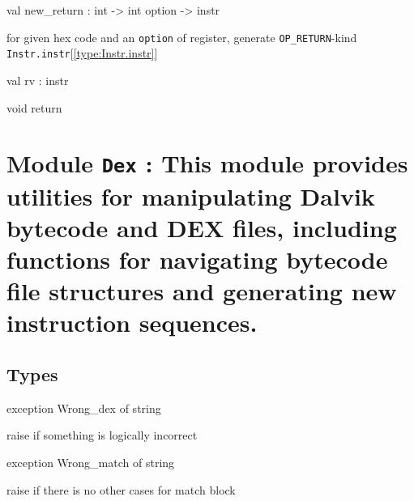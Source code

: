 \documentclass[11pt]{article}
\begin{document}
\label{val:Instr.new-underscorereturn}\begin{ocamldoccode}
val new_return : int -> int option -> instr
\end{ocamldoccode}
\begin{ocamldocdescription}
for given hex code and an {\tt{option}} of register,
 generate {\tt{OP\_RETURN}}-kind {\tt{Instr.instr}}[\ref{type:Instr.instr}]


\end{ocamldocdescription}




\label{val:Instr.rv}\begin{ocamldoccode}
val rv : instr
\end{ocamldoccode}
\begin{ocamldocdescription}
void return


\end{ocamldocdescription}


\section{Module {\tt{Dex}} : This module provides utilities for manipulating Dalvik bytecode
    and DEX files, including functions for navigating bytecode file
    structures and generating new instruction sequences.}
\label{module:Dex}




\ocamldocvspace{0.5cm}



\subsection{Types}




\label{exception:Dex.Wrong-underscoredex}\begin{ocamldoccode}
exception Wrong_dex of string
\end{ocamldoccode}
\begin{ocamldocdescription}
raise if something is logically incorrect


\end{ocamldocdescription}




\label{exception:Dex.Wrong-underscorematch}\begin{ocamldoccode}
exception Wrong_match of string
\end{ocamldoccode}
\begin{ocamldocdescription}
raise if there is no other cases for match block


\end{ocamldocdescription}
\end{document}

